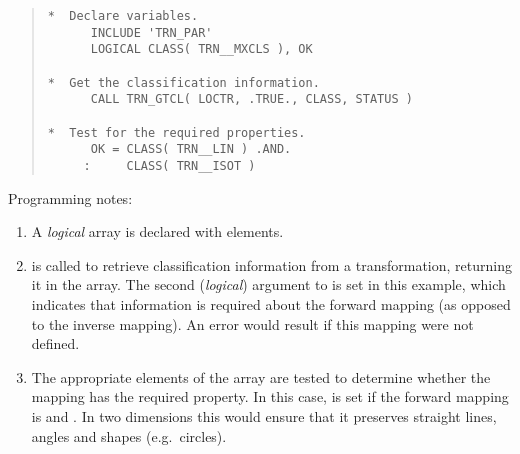 \begin{quote} \begin{tabbing} 

\verb#*  Declare variables.                                  #\\
\verb#      INCLUDE 'TRN_PAR'                                #\\
\verb#      LOGICAL CLASS( TRN__MXCLS ), OK                  #\\
\verb#                                                       #\\
\verb#*  Get the classification information.                 #\\
\verb#      CALL TRN_GTCL( LOCTR, .TRUE., CLASS, STATUS )    #\\
\verb#                                                       #\\
\verb#*  Test for the required properties.                   #\\
\verb#      OK = CLASS( TRN__LIN ) .AND.                     #\\
\verb#     :     CLASS( TRN__ISOT )                          # 

\end{tabbing}
\end{quote} 

Programming notes:

\begin{enumerate} 

\item A {\em logical} array  is declared with
 elements. 

\item {} is called to retrieve classification information from
a transformation, returning it in the  array.
The second ({\em logical}) argument to  is set 
in this example, which indicates that information is required about the
forward mapping (as opposed to the inverse mapping). 
An error would result if this mapping were not defined.

\item The appropriate elements of the  array are tested to
determine whether the mapping has the required property.
In this case,  is set  if the forward mapping is
 and . 
In two dimensions this would ensure that it preserves straight lines, angles
and shapes ({e.g.}\ circles). 

\end{enumerate}
\exampledone 

